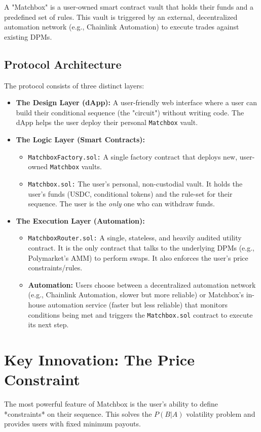 \documentclass[11pt, a4paper]{article}
\begin{document}
A "Matchbox" is a user-owned smart contract vault that holds their funds and a predefined set of rules. This vault is triggered by an external, decentralized automation network (e.g., Chainlink Automation) to execute trades against existing DPMs.

\subsection{Protocol Architecture}
The protocol consists of three distinct layers:

\begin{itemize}
    \item \textbf{The Design Layer (dApp):} A user-friendly web interface where a user can build their conditional sequence (the "circuit") without writing code. The dApp helps the user deploy their personal \texttt{Matchbox} vault.

    \item \textbf{The Logic Layer (Smart Contracts):}
    \begin{itemize}
        \item \texttt{MatchboxFactory.sol:} A single factory contract that deploys new, user-owned \texttt{Matchbox} vaults.
        \item \texttt{Matchbox.sol:} The user's personal, non-custodial vault. It holds the user's funds (USDC, conditional tokens) and the rule-set for their sequence. The user is the \textit{only} one who can withdraw funds.
    \end{itemize}

    \item \textbf{The Execution Layer (Automation):}
    \begin{itemize}
        \item \texttt{MatchboxRouter.sol:} A single, stateless, and heavily audited utility contract. It is the only contract that talks to the underlying DPMs (e.g., Polymarket's AMM) to perform swaps. It also enforces the user's price constraints/rules.
        \item \textbf{Automation:} Users choose between a decentralized automation network (e.g., Chainlink Automation, slower but more reliable) or Matchbox's in-house automation service (faster but less reliable) that monitors conditions being met and triggers the \texttt{Matchbox.sol} contract to execute its next step.
    \end{itemize}
\end{itemize}

\section{Key Innovation: The Price Constraint}
The most powerful feature of Matchbox is the user's ability to define *constraints* on their sequence. This solves the $P(B|A)$ volatility problem and provides users with fixed minimum payouts.
\end{document}
